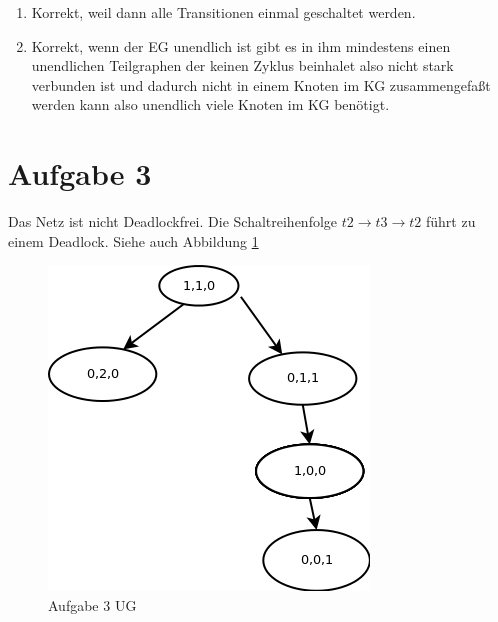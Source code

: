 \documentclass[10pt]{scrartcl}
\begin{document}
\begin{enumerate}
	\item Korrekt, weil dann alle Transitionen einmal geschaltet werden.
	
	\item Korrekt, wenn der EG unendlich ist gibt es in ihm mindestens einen unendlichen Teilgraphen der keinen Zyklus beinhalet	also nicht stark verbunden ist und dadurch nicht in einem Knoten im KG zusammengefaßt werden kann also unendlich viele Knoten im KG benötigt.
	
	
\end{enumerate}
\section{Aufgabe 3}
Das Netz ist nicht Deadlockfrei. Die Schaltreihenfolge $t2 \rightarrow t3 \rightarrow t2$ führt zu einem Deadlock. Siehe auch Abbildung \ref{petri:aufg3}
	\begin{figure}[H]
    			\centering
				\includegraphics[scale=0.5]{aufg3.png}		
            	\caption{Aufgabe 3 UG}
            	\label{petri:aufg3}
			\end{figure}
\end{document}
